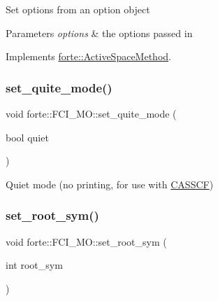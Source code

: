 Set options from an option object 
\begin{DoxyParams}{Parameters}
{\em options} & the options passed in \\
\hline
\end{DoxyParams}


Implements \mbox{\hyperlink{classforte_1_1_active_space_method_a9416a627f550d4d56f6b8ffe7478ed89}{forte\+::\+Active\+Space\+Method}}.

\mbox{\label{classforte_1_1_f_c_i___m_o_adaf4af25c6acef5545de125cbafaf7a8}} 
\subsubsection{\texorpdfstring{set\+\_\+quite\+\_\+mode()}{set\_quite\_mode()}}
{\footnotesize\ttfamily void forte\+::\+F\+C\+I\+\_\+\+M\+O\+::set\+\_\+quite\+\_\+mode (\begin{DoxyParamCaption}\item[{bool}]{quiet }\end{DoxyParamCaption})\hspace{0.3cm}{\ttfamily [inline]}}



Quiet mode (no printing, for use with \mbox{\hyperlink{classforte_1_1_c_a_s_s_c_f}{C\+A\+S\+S\+CF}}) 

\mbox{\label{classforte_1_1_f_c_i___m_o_a43c52bd5160618567f8985d6f4057aa9}} 
\subsubsection{\texorpdfstring{set\+\_\+root\+\_\+sym()}{set\_root\_sym()}}
{\footnotesize\ttfamily void forte\+::\+F\+C\+I\+\_\+\+M\+O\+::set\+\_\+root\+\_\+sym (\begin{DoxyParamCaption}\item[{int}]{root\+\_\+sym }\end{DoxyParamCaption})\hspace{0.3cm}{\ttfamily [inline]}}



